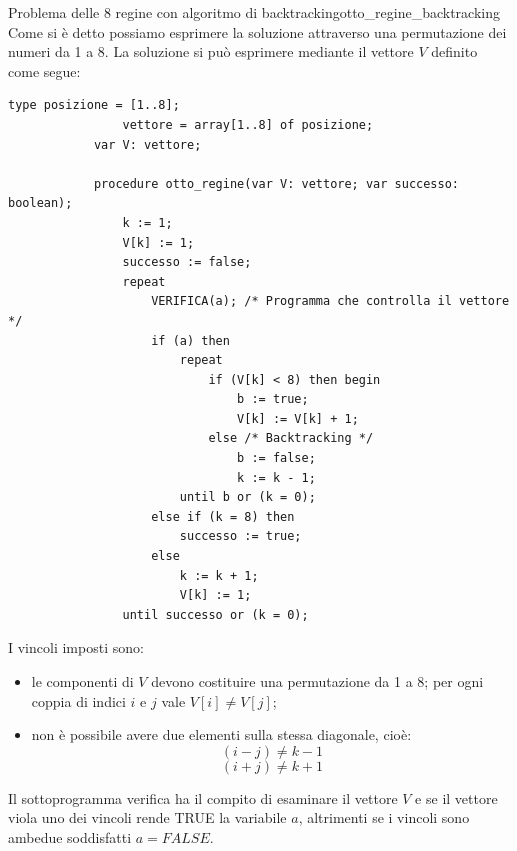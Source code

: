 \documentclass[12pt]{report}
\newcommand{\nmu}{}
\begin{document}
 	\begin{example}{\nmu Problema delle 8 regine con algoritmo di backtracking}{otto_regine_backtracking}
 		Come si è detto possiamo esprimere la soluzione attraverso una permutazione dei numeri da 1 a 8. La soluzione si può esprimere mediante il vettore $V$ definito come segue:
 		\begin{lstlisting}[style=pascalstyle]
 			type posizione = [1..8];
 				vettore = array[1..8] of posizione;
 			var V: vettore;

 			procedure otto_regine(var V: vettore; var successo: boolean);
 				k := 1;
 				V[k] := 1;
 				successo := false;
 				repeat
 					VERIFICA(a); /* Programma che controlla il vettore */
 					if (a) then
 						repeat
 							if (V[k] < 8) then begin
 								b := true;
 								V[k] := V[k] + 1;
 							else /* Backtracking */
 								b := false;
 								k := k - 1;
 						until b or (k = 0);
 					else if (k = 8) then
 						successo := true;
 					else
 						k := k + 1;
 						V[k] := 1;
 				until successo or (k = 0);
 		\end{lstlisting}
 		I vincoli imposti sono:
 		\begin{itemize}
 			\item le componenti di $V$ devono costituire una permutazione da 1 a 8; per ogni coppia di indici $i$ e $j$ vale $V[i] \neq V[j]$;
 			\item non è possibile avere due elementi sulla stessa diagonale, cioè:
 			\[
 			(i - j) \neq k - 1
 			\]
 			\[
 			(i + j) \neq k + 1
 			\]
 		\end{itemize}
 		Il sottoprogramma verifica ha il compito di esaminare il vettore $V$ e se il vettore viola uno dei vincoli rende TRUE la variabile $a$, altrimenti se i vincoli sono ambedue soddisfatti $a = FALSE$.
 	\end{example}
\end{document}

